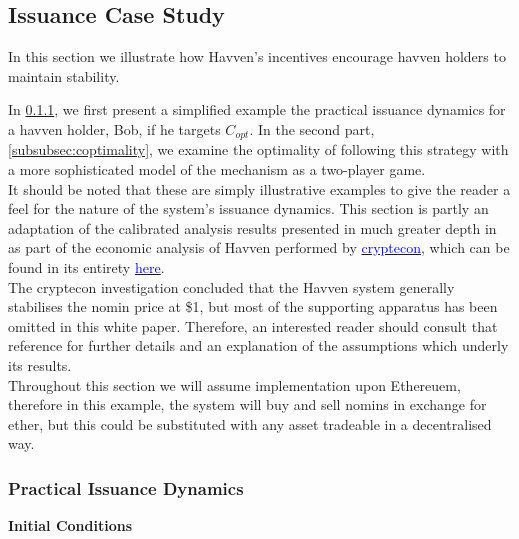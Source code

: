 \newpage

\subsection{Issuance Case Study}

\noindent In this section we illustrate how Havven's incentives encourage havven holders to
maintain stability.

\noindent In \ref{subsubsec:practicalissuance}, we first present a simplified example the practical issuance
dynamics for a havven holder, Bob, if he targets \(C_{opt}\). In the second part, \ref{subsubsec:coptimality},
we examine the optimality of following this strategy with a more sophisticated model
of the mechanism as a two-player game. \\

\noindent It should be noted that these are simply illustrative examples to give the 
reader a feel for the nature of the system's issuance dynamics. This
section is partly an adaptation of the calibrated analysis results presented
in much greater depth in as part of the economic analysis of Havven performed by
\href{http://cryptecon.org/}{\textcolor{blue}{cryptecon}}, which can be found in
its entirety \href{https://havven.io/uploads/havven_cryptecon_report_may_2018.pdf}{\textcolor{blue}{here}}. \\

\noindent The cryptecon investigation concluded that the Havven system
generally stabilises the nomin price at \$1, but most of the supporting
apparatus has been omitted in this white paper. Therefore, an interested reader should
consult that reference for further details and an explanation of the assumptions
which underly its results. \\

\noindent Throughout this section we will assume implementation upon Ethereuem, therefore
in this example, the system will buy and sell nomins in exchange for ether, but this could be 
substituted with any asset tradeable in a decentralised way. \\

\newpage
\subsubsection{Practical Issuance Dynamics}
\label{subsubsec:practicalissuance}

\noindent \textbf{Initial Conditions} \\

